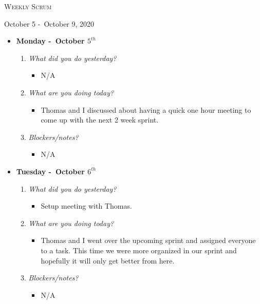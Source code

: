 \centerline{\LARGE\textsc{Weekly Scrum}}
\centerline{October 5 -\ October 9, 2020}
\textbf{}
\begin{itemize}
  \item[] \textbf{\large Monday -\ October \(5^{th}\)}
  \begin{enumerate}
    \item \textsl{What did you do yesterday?}
    \begin{itemize}
      \item N/A
    \end{itemize}
    \item \textsl{What are you doing today?}
    \begin{itemize}
      \item Thomas and I discussed about having a quick one hour meeting to come up with the next 2 week sprint.
    \end{itemize}
    \item \textsl{Blockers/notes?}
    \begin{itemize}
      \item N/A 
    \end{itemize}
  \end{enumerate}
\end{itemize}
\textbf{}
\begin{itemize}
  \item[] \textbf{\large Tuesday -\ October \(6^{th}\)}
  \begin{enumerate}
    \item \textsl{What did you do yesterday?}
    \begin{itemize}
      \item Setup meeting with Thomas.
    \end{itemize}
    \item \textsl{What are you doing today?}
    \begin{itemize}
      \item Thomas and I went over the upcoming sprint and assigned everyone to a task. This time we were more organized in our sprint and
      hopefully it will only get better from here.
    \end{itemize}
    \item \textsl{Blockers/notes?}
    \begin{itemize}
      \item N/A
    \end{itemize}
  \end{enumerate}
\end{itemize}
\textbf{}
